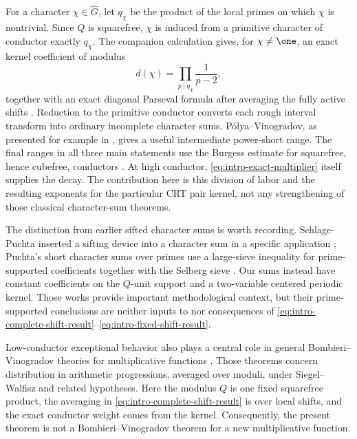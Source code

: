 For a character $\chi\in\widehat G$, let $q_\chi$ be the product of the local
primes on which $\chi$ is nontrivial.  Since $Q$ is squarefree, $\chi$ is
induced from a primitive character of conductor exactly $q_\chi$.  The
companion calculation gives, for $\chi\ne\one$, an exact kernel coefficient
of modulus
\begin{equation}\label{eq:intro-exact-multiplier}
 d(\chi)=\prod_{p\mid q_\chi}\frac1{p-2},
\end{equation}
together with an exact diagonal Parseval formula after averaging the fully
active shifts \citep{WangCenteredKernels2026}.  Reduction to the primitive
conductor converts each rough interval transform into ordinary incomplete
character sums.  P\'olya--Vinogradov, as presented for example in
\citep[Section~9.4]{MontgomeryVaughan2007}, gives a useful intermediate
power-short range.  The final ranges in all three main statements use the
Burgess estimate for squarefree, hence cubefree, conductors
\citep{Burgess1962,Burgess1963II}.  At high conductor,
\eqref{eq:intro-exact-multiplier} itself supplies the decay.  The contribution
here is this division of labor and the resulting exponents for the particular
CRT pair kernel, not any strengthening of those classical character-sum
theorems.

The distinction from earlier sifted character sums is worth recording.
Schlage-Puchta inserted a sifting device into a character sum in a specific
application \citep{SchlagePuchta2006}; Puchta's short character sums over
primes use a large-sieve inequality for prime-supported coefficients together
with the Selberg sieve \citep{Puchta2003}.  Our sums instead have constant
coefficients on the $Q$-unit support and a two-variable centered periodic
kernel.  Those works provide important methodological context, but their
prime-supported conclusions are neither inputs to nor consequences of
\eqref{eq:intro-complete-shift-result}--\eqref{eq:intro-fixed-shift-result}.

Low-conductor exceptional behavior also plays a central role in general
Bombieri--Vinogradov theories for multiplicative functions
\citep{GranvilleShao2018,GranvilleShao2019}.  Those theorems concern
distribution in arithmetic progressions, averaged over moduli, under
Siegel--Walfisz and related hypotheses.  Here the modulus $Q$ is one fixed
squarefree product, the averaging in \eqref{eq:intro-complete-shift-result}
is over local shifts, and the exact conductor weight comes from the kernel.
Consequently, the present theorem is not a Bombieri--Vinogradov theorem for a
new multiplicative function.

